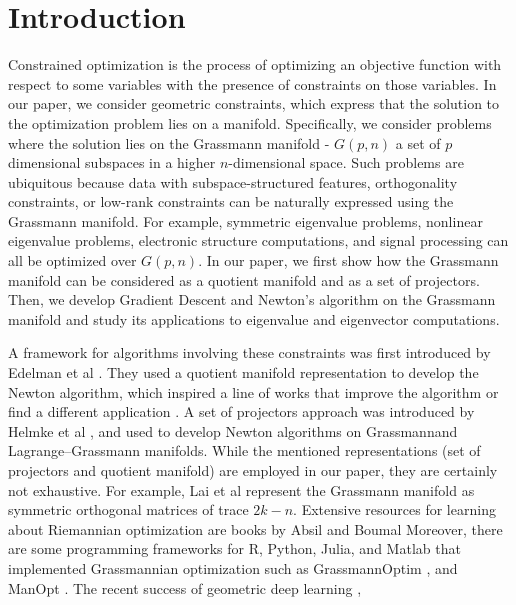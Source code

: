 \documentclass[11pt,a4paper]{report}
\begin{document}
\chapter{Introduction}
Constrained optimization is the process of optimizing an objective function with respect to some variables with the presence of constraints on those variables.
In our paper, we consider geometric constraints, which express that the solution to the optimization problem lies on a manifold.
Specifically, we consider problems where the solution lies on the Grassmann manifold - $G(p, n)$ a set of $p$ dimensional subspaces in a higher $n$-dimensional space.
Such problems are ubiquitous because data with subspace-structured features, orthogonality constraints, or low-rank constraints can be naturally expressed using the Grassmann manifold.
For example, symmetric eigenvalue problems, nonlinear eigenvalue problems, electronic structure computations, and signal processing can all be optimized over $G(p, n)$.
In our paper, we first show how the Grassmann manifold can be considered as a quotient manifold and as a set of projectors.
Then, we develop Gradient Descent and Newton’s algorithm on the Grassmann manifold and study its applications to eigenvalue and eigenvector computations.
\par
A framework for algorithms involving these constraints was first introduced by Edelman et al \cite{edelman_geometry_1998} .
They used a quotient manifold representation to develop the Newton algorithm, which inspired a line of works that improve the algorithm or find a different application \cite{hamm_grassmann_nodate} \cite{ma_flag_2020} \cite{johnsson_optimization_nodate} \cite{tripuraneni_averaging_2018}.
A set of projectors approach was introduced by Helmke et al \cite{helmke_newtons_2007}, and used to develop Newton algorithms on Grassmannand Lagrange--Grassmann manifolds.
While the mentioned representations (set of projectors and quotient manifold) are employed in our paper, they are certainly not exhaustive.
For example, Lai et al \cite{lai_simpler_2020} represent the Grassmann manifold as symmetric orthogonal matrices of trace $2k -n$.
Extensive resources for learning about Riemannian optimization are books by Absil \cite{AbsMahSep2008} and Boumal \cite{boumal2022intromanifolds}
Moreover, there are some programming frameworks for R, Python, Julia, and Matlab that implemented Grassmannian optimization such as GrassmannOptim \cite{adragni_grassmannoptim_2012}, and ManOpt \cite{JMLR:v17:16-177}.
The recent success of geometric deep learning \cite{DBLP:journals/corr/abs-2104-13478} \cite{masci_geodesic_2018}, 
\end{document}
